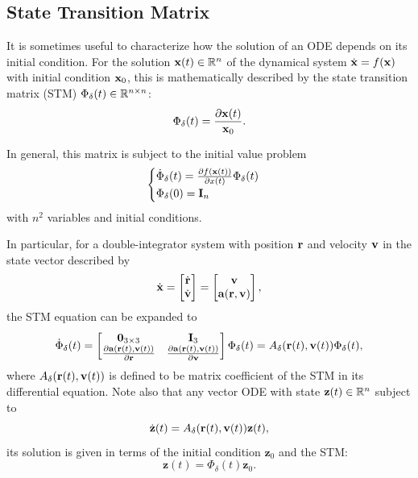 \subsection{State Transition Matrix}

It is sometimes useful to characterize how the solution of an ODE depends on its initial condition. For the solution \(\mathbf{x}(t) \in \mathbb{R}^n\) of the dynamical system \(\dot{\mathbf{x}} = f(\mathbf{x})\) with initial condition \(\mathbf{x}_0\), this is mathematically described by the state transition matrix (STM) \(\Phi_\delta(t) \in \mathbb{R}^{n \times n}\):
\begin{equation}\label{eq:stm_def}
    \Phi_\delta(t) = \frac{\partial \x(t)}{\x_0}.
\end{equation}

In general, this matrix is subject to the initial value problem~\cite{montenbruck2000satellite}
\begin{equation}
    \begin{cases}
        \dot{\Phi}_\delta(t) = \frac{\partial f(\mathbf{x}(t))}{\partial x(t)} \Phi_\delta(t) \\
        \Phi_\delta(0) = \mathbf{I}_n
    \end{cases}
\end{equation}
with \(n^2\) variables and initial conditions.

In particular, for a double-integrator system with position \(\mathbf{r}\) and velocity \(\mathbf{v}\) in the state vector described by
\begin{equation}
    \dot{\mathbf{x}} = \begin{bmatrix}
        \dot{\mathbf{r}} \\ \dot{\mathbf{v}}
    \end{bmatrix} = \begin{bmatrix}
        \mathbf{v} \\ \mathbf{a}(\mathbf{r}, \mathbf{v})
    \end{bmatrix},
\end{equation}
the STM equation can be expanded to
\begin{equation}\label{eq:STM_r_v}
    \dot{\Phi}_\delta(t) = \begin{bmatrix}
        \mathbf{0}_{3\times 3} & \mathbf{I}_3 \\
        \frac{\partial \acc(\pos(t), \vel(t))}{\partial \pos} & \frac{\partial \acc(\pos(t), \vel(t))}{\partial \vel}
    \end{bmatrix} \Phi_\delta(t) = A_\delta(\pos(t), \vel(t)) \Phi_\delta(t),
\end{equation}
where \(A_\delta(\mathbf{r}(t), \mathbf{v}(t))\) is defined to be matrix coefficient of the STM in its differential equation. Note also that any vector ODE with state \(\mathbf{z}(t) \in \mathbb{R}^n\) subject to
\begin{equation}
    \dot{\mathbf{z}}(t) = A_\delta(\mathbf{r}(t), \mathbf{v}(t)) \mathbf{z}(t),
\end{equation}
its solution is given in terms of the initial condition \(\mathbf{z}_0\) and the STM:
\begin{equation}\label{eq:remark_STM}
    \mathbf{z}(t) = \Phi_\delta(t) \mathbf{z}_0.
\end{equation}

